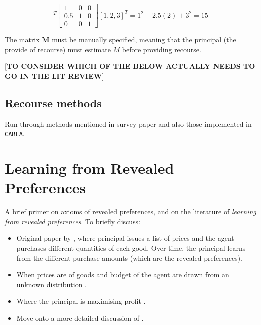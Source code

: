 \begin{equation}
	[1, 2, 3]^T \left[\begin{array}{lllll}
		1 & 0 & 0 \\
		0.5 & 1 & 0 \\
		0 & 0 & 1
	\end{array}\right] [1, 2, 3]^T = 1^2 + 2.5(2) + 3^2 = 15
\end{equation}

The matrix $\boldsymbol{M}$ must be manually specified, meaning that the principal (the provide of recourse) must estimate $M$ before providing recourse. 

[\textbf{TO CONSIDER WHICH OF THE BELOW ACTUALLY NEEDS TO GO IN THE LIT REVIEW}]

\subsection{Recourse methods}
Run through methods mentioned in survey paper \citep{karimiSurveyAlgorithmicRecourse2022} and also those implemented in \href{https://carla-counterfactual-and-recourse-library.readthedocs.io/en/latest/recourse.html}{\texttt{CARLA}}.


\section{Learning from Revealed Preferences} \label{section:revealed_pref_lit}
A brief primer on axioms of revealed preferences, and on the literature of \textit{learning from revealed preferences}. To briefly discuss:

\begin{itemize}
	\item Original paper by \textcite{beigmanLearningRevealedPreference2006}, where principal issues a list of prices and the agent purchases different quantities of each good. Over time, the principal learns from the different purchase amounts (which are the revealed preferences).
	\item When prices are of goods and budget of the agent are drawn from an unknown distribution \citep{zadimoghaddamEfficientlyLearningRevealed2012, balcanLearningEconomicParameters2014}.
	\item Where the principal is maximising profit \citep{aminOnlineLearningProfit2015, rothWatchLearnOptimizing2016}.
	\item Move onto a more detailed discussion of \textcite{dongStrategicClassificationRevealed2018}.
\end{itemize}



